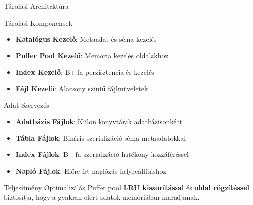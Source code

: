 \documentclass[aspectratio=169]{beamer}
\begin{document}
\begin{frame}{Tárolási Architektúra}
\begin{block}{Tárolási Komponensek}
\begin{itemize}
    \item \textbf{Katalógus Kezelő}: Metaadat és séma kezelés
    \item \textbf{Puffer Pool Kezelő}: Memória kezelés oldalakhoz
    \item \textbf{Index Kezelő}: B+ fa perzisztencia és kezelés
    \item \textbf{Fájl Kezelő}: Alacsony szintű fájlműveletek
\end{itemize}
\end{block}

\begin{block}{Adat Szervezés}
\begin{itemize}
    \item \textbf{Adatbázis Fájlok}: Külön könyvtárak adatbázisonként
    \item \textbf{Tábla Fájlok}: Bináris szerializáció séma metaadatokkal
    \item \textbf{Index Fájlok}: B+ fa szerializáció hatékony hozzáféréssel
    \item \textbf{Napló Fájlok}: Előre írt naplózás helyreállításhoz
\end{itemize}
\end{block}

\begin{alertblock}{Teljesítmény Optimalizálás}
Puffer pool \textbf{LRU kiszorítással} és \textbf{oldal rögzítéssel} biztosítja, hogy a gyakran elért adatok memóriában maradjanak.
\end{alertblock}
\end{frame}
\end{document}
